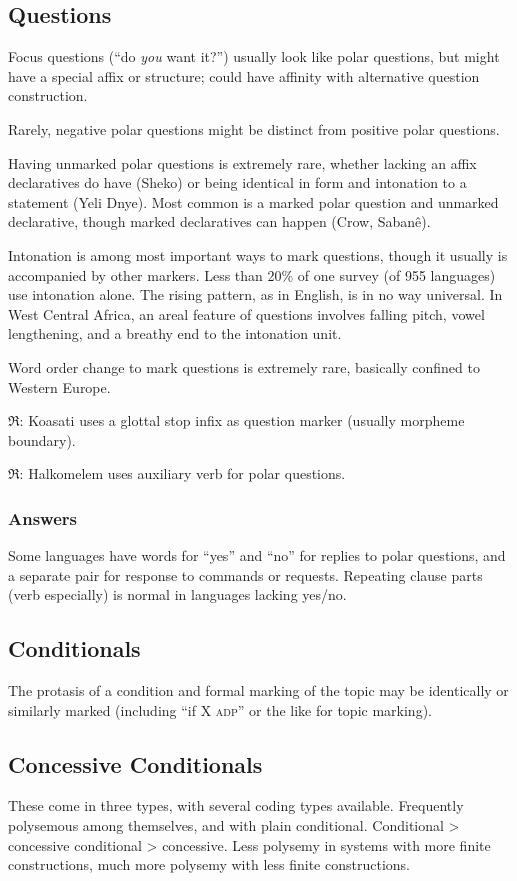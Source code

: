 \documentclass[11pt]{article}
\newcommand{\I}[1]{\textsc{#1}}   %
\newcommand{\rara}[1]{$\mathfrak{R}$: #1}
\begin{document}
{\subsection{Questions}
Focus questions (``do \textit{you} want it?'') usually look like polar
questions, but might have a special affix or structure; could have
affinity with alternative question construction.

Rarely, negative polar questions might be distinct from positive polar
questions. 

Having unmarked polar questions is extremely rare, whether lacking an
affix declaratives do have (Sheko) or being identical in form and
intonation to a statement (Yeli Dnye).  Most common is a marked polar
question and unmarked declarative, though marked declaratives can
happen (Crow, Sabanê).

Intonation is among most important ways to mark questions, though it
usually is accompanied by other markers.  Less than 20\% of one survey
(of 955 languages) use intonation alone.  The rising pattern, as in
English, is in no way universal.  In West Central Africa, an areal
feature of questions involves falling pitch, vowel lengthening, and a
breathy end to the intonation unit.

Word order change to mark questions is extremely rare, basically
confined to Western Europe.

\rara{Koasati uses a glottal stop infix as question marker (usually
morpheme boundary).}

\rara{Halkomelem uses auxiliary verb for polar questions.}

\subsubsection{Answers}
Some languages have words for ``yes'' and ``no'' for replies to polar
questions, and a separate pair for response to commands or requests.
Repeating clause parts (verb especially) is normal in languages
lacking yes/no.



\subsection{Conditionals}
The protasis of a condition and formal marking of the topic may be
identically or similarly marked (including ``if X \I{adp}'' or the
like for topic marking).

\subsection{Concessive Conditionals}
These come in three types, with several coding types available.
Frequently polysemous among themselves, and with plain conditional.
Conditional > concessive conditional > concessive.  Less polysemy in
systems with more finite constructions, much more polysemy with less
finite constructions.

}
\end{document}
